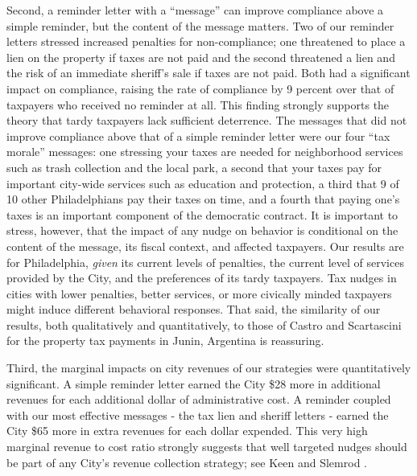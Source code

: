 \documentclass[12pt]{article}
\newcommand{\TAG}[1]{}
\begin{document}
Second, a reminder letter with a ``message'' can improve compliance
above a simple reminder, but the content of the message matters.  Two
of our reminder letters stressed increased penalties for
non-compliance; one threatened to place a lien on the property if
taxes are not paid and the second threatened a lien and the risk of an
immediate sheriff's sale if taxes are not paid.  Both had a
significant impact on compliance, raising the rate of compliance by 9
percent over that of taxpayers who received no reminder at all.  This finding
strongly supports the theory that tardy taxpayers lack sufficient deterrence.
The messages that did not improve compliance above that of a simple
reminder letter were our four ``tax morale'' messages: one stressing
your taxes are needed for neighborhood services such as trash
collection and the local park, a second that your taxes pay for
important city-wide services such as education and protection, a third
that 9 of 10 other Philadelphians pay their taxes on time, and a
fourth that paying one's taxes is an important component of the
democratic contract. It is important to stress, however, that the impact of any nudge on behavior is conditional on the content of the message, its fiscal context, and affected taxpayers. Our results are for Philadelphia, \textit{given} its current levels of penalties, the current level of services provided by the City, and the preferences of its tardy taxpayers. Tax nudges in cities with lower penalties, better services, or more civically minded taxpayers might induce different behavioral responses. That said, the similarity of our results, both qualitatively and quantitatively, to those of Castro and Scartascini \citeyear{castro} for the property tax payments in Junin, Argentina is reassuring.

Third, the marginal impacts on city revenues of our strategies were quantitatively significant. A simple reminder letter earned the City \$28 more in additional revenues for each additional dollar of administrative cost. A reminder coupled with our most effective messages - the tax lien and sheriff letters - earned the City \$65 more in extra revenues for each dollar expended. This very high marginal revenue to cost ratio strongly suggests that well targeted nudges should be part of any City's revenue collection strategy; see Keen and Slemrod \citeyear{keen2016optimal}.

\nocite{dellavigna2012testing}

\TAG{END_CONCLUSION}

\newpage
\end{document}
